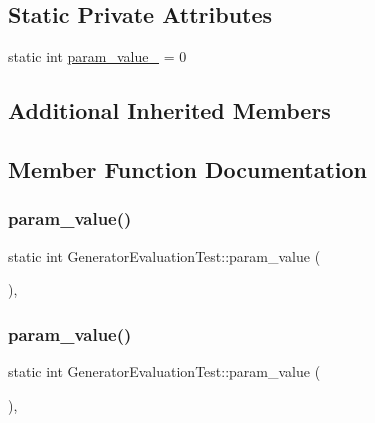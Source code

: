 \subsection*{Static Private Attributes}
\begin{DoxyCompactItemize}
\item 
static int \mbox{\hyperlink{class_generator_evaluation_test_a6bae9750692a4cc4799176eada25ef99}{param\+\_\+value\+\_\+}} = 0
\end{DoxyCompactItemize}
\subsection*{Additional Inherited Members}


\subsection{Member Function Documentation}
\mbox{\label{class_generator_evaluation_test_ac819769e32b738677401424deb3c8cbe}} 
\subsubsection{\texorpdfstring{param\_value()}{param\_value()}\hspace{0.1cm}{\footnotesize\ttfamily [1/3]}}
{\footnotesize\ttfamily static int Generator\+Evaluation\+Test\+::param\+\_\+value (\begin{DoxyParamCaption}{ }\end{DoxyParamCaption})\hspace{0.3cm}{\ttfamily [inline]}, {\ttfamily [static]}}

\mbox{\label{class_generator_evaluation_test_ac819769e32b738677401424deb3c8cbe}} 
\subsubsection{\texorpdfstring{param\_value()}{param\_value()}\hspace{0.1cm}{\footnotesize\ttfamily [2/3]}}
{\footnotesize\ttfamily static int Generator\+Evaluation\+Test\+::param\+\_\+value (\begin{DoxyParamCaption}{ }\end{DoxyParamCaption})\hspace{0.3cm}{\ttfamily [inline]}, {\ttfamily [static]}}

